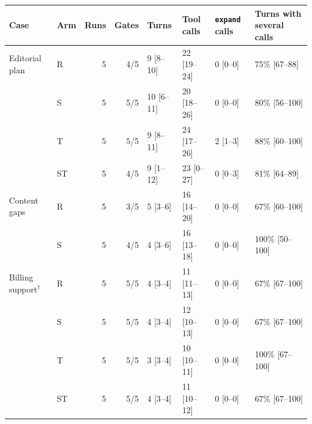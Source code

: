 \begin{tabular}{llrrllll}
\toprule
Case & Arm & Runs & Gates & Turns & Tool calls & \texttt{expand} calls & Turns with several calls \\
\midrule
Editorial plan & R & 5 & 4/5 & 9 [8--10] & 22 [19--24] & 0 [0--0] & 75\% [67--88] \\
 & S & 5 & 5/5 & 10 [6--11] & 20 [18--26] & 0 [0--0] & 80\% [56--100] \\
 & T & 5 & 5/5 & 9 [8--11] & 24 [17--26] & 2 [1--3] & 88\% [60--100] \\
 & ST & 5 & 4/5 & 9 [1--12] & 23 [0--27] & 0 [0--3] & 81\% [64--89] \\
\addlinespace
Content gaps & R & 5 & 3/5 & 5 [3--6] & 16 [14--20] & 0 [0--0] & 67\% [60--100] \\
 & S & 5 & 4/5 & 4 [3--6] & 16 [13--18] & 0 [0--0] & 100\% [50--100] \\
\addlinespace
Billing support$^\dagger$ & R & 5 & 5/5 & 4 [3--4] & 11 [11--13] & 0 [0--0] & 67\% [67--100] \\
 & S & 5 & 5/5 & 4 [3--4] & 12 [10--13] & 0 [0--0] & 67\% [67--100] \\
 & T & 5 & 5/5 & 3 [3--4] & 10 [10--11] & 0 [0--0] & 100\% [67--100] \\
 & ST & 5 & 5/5 & 4 [3--4] & 11 [10--12] & 0 [0--0] & 67\% [67--100] \\
\bottomrule
\end{tabular}
